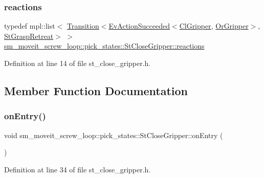 \subsubsection{\texorpdfstring{reactions}{reactions}}
{\footnotesize\ttfamily typedef mpl\+::list$<$ \hyperlink{classsmacc_1_1Transition}{Transition}$<$\hyperlink{structsmacc_1_1default__events_1_1EvActionSucceeded}{Ev\+Action\+Succeeded}$<$\hyperlink{classsm__moveit__screw__loop_1_1cl__gripper_1_1ClGripper}{Cl\+Gripper}, \hyperlink{classsm__moveit__screw__loop_1_1OrGripper}{Or\+Gripper}$>$, \hyperlink{structsm__moveit__screw__loop_1_1pick__states_1_1StGraspRetreat}{St\+Grasp\+Retreat}$>$ $>$ \hyperlink{structsm__moveit__screw__loop_1_1pick__states_1_1StCloseGripper_a9ed485a3ebec02d1997b55bdc968e9c8}{sm\+\_\+moveit\+\_\+screw\+\_\+loop\+::pick\+\_\+states\+::\+St\+Close\+Gripper\+::reactions}}



Definition at line 14 of file st\+\_\+close\+\_\+gripper.\+h.



\subsection{Member Function Documentation}
\mbox{\label{structsm__moveit__screw__loop_1_1pick__states_1_1StCloseGripper_a6a130372d2457dcc7d9b79fb204e90e1}} 
\subsubsection{\texorpdfstring{on\+Entry()}{onEntry()}}
{\footnotesize\ttfamily void sm\+\_\+moveit\+\_\+screw\+\_\+loop\+::pick\+\_\+states\+::\+St\+Close\+Gripper\+::on\+Entry (\begin{DoxyParamCaption}{ }\end{DoxyParamCaption})\hspace{0.3cm}{\ttfamily [inline]}}



Definition at line 34 of file st\+\_\+close\+\_\+gripper.\+h.


